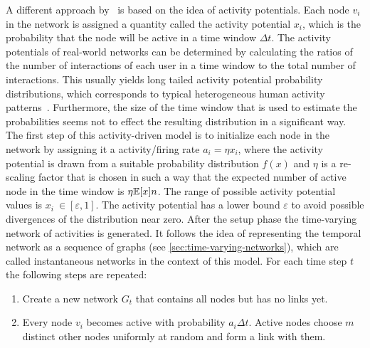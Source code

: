 A different approach by~\citet{Perra2012a} is based on the idea of activity potentials.
Each node \(v_{i}\) in the network is assigned a quantity called the activity potential \(x_{i}\), which is the probability that the node will be active in a time window \(\Delta t\).
The activity potentials of real-world networks can be determined by calculating the ratios of the number of interactions of each user in a time window to the total number of interactions.
This usually yields long tailed activity potential probability distributions, which corresponds to typical heterogeneous human activity patterns~\cite{Vazquez2006, Jo2012}.
Furthermore, the size of the time window that is used to estimate the probabilities seems not to effect the resulting distribution in a significant way.
The first step of this activity-driven model is to initialize each node in the network by assigning it a activity/firing rate \(a_{i} = \eta x_{i}\), where the activity potential is drawn from a suitable probability distribution \( f(x) \) and \( \eta \) is a re-scaling factor that is chosen in such a way that the expected number of active node in the time window is \(\eta \mathbb{E}[{x}] n\).
The range of possible activity potential values is \(x_{i}\ \in [\varepsilon, 1]\).
The activity potential has a lower bound \( \varepsilon \) to avoid possible divergences of the distribution near zero.
After the setup phase the time-varying network of activities is generated.
It follows the idea of representing the temporal network as a sequence of graphs (see \autoref{sec:time-varying-networks}), which are called instantaneous networks in the context of this model.
For each time step \(t\) the following steps are repeated:

\begin{enumerate}
    \item Create a new network \(G_{t}\) that contains all nodes but has no links yet.
    \item Every node \(v_{i}\) becomes active with probability \(a_{i} \Delta t\). Active nodes choose \(m\) distinct other nodes uniformly at random and form a link with them.
\end{enumerate}

